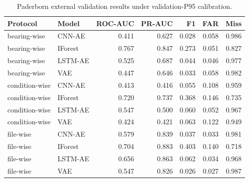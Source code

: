 \begin{table}[t]
\centering
\caption{Paderborn external validation results under validation-P95 calibration.}
\label{tab:paderborn_external}
\small
\begin{tabular}{llrrrrr}
\toprule
Protocol & Model & ROC-AUC & PR-AUC & F1 & FAR & Miss \\
\midrule
bearing-wise & CNN-AE & 0.411 & 0.627 & 0.028 & 0.058 & 0.986 \\
bearing-wise & IForest & 0.767 & 0.847 & 0.273 & 0.051 & 0.827 \\
bearing-wise & LSTM-AE & 0.525 & 0.687 & 0.044 & 0.046 & 0.977 \\
bearing-wise & VAE & 0.447 & 0.646 & 0.033 & 0.058 & 0.982 \\
condition-wise & CNN-AE & 0.413 & 0.416 & 0.055 & 0.108 & 0.959 \\
condition-wise & IForest & 0.720 & 0.737 & 0.368 & 0.146 & 0.735 \\
condition-wise & LSTM-AE & 0.547 & 0.500 & 0.060 & 0.052 & 0.967 \\
condition-wise & VAE & 0.424 & 0.421 & 0.063 & 0.122 & 0.949 \\
file-wise & CNN-AE & 0.579 & 0.839 & 0.037 & 0.033 & 0.981 \\
file-wise & IForest & 0.704 & 0.883 & 0.403 & 0.140 & 0.718 \\
file-wise & LSTM-AE & 0.656 & 0.863 & 0.062 & 0.034 & 0.968 \\
file-wise & VAE & 0.547 & 0.826 & 0.026 & 0.027 & 0.987 \\
\bottomrule
\end{tabular}
\end{table}